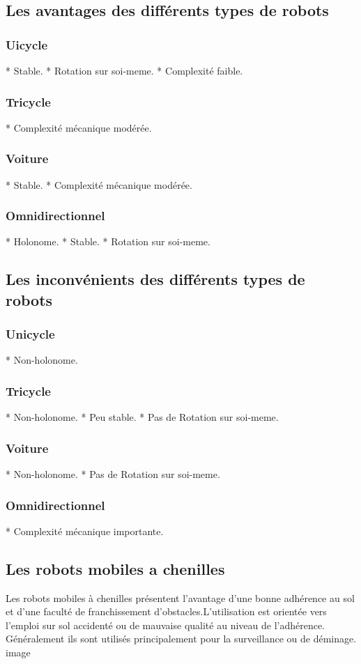 \subsection{Les avantages des différents types de robots }
\subsubsection{Uicycle}
* Stable.
* Rotation sur soi-meme.
* Complexité faible.
\subsubsection*{Tricycle}
* Complexité mécanique modérée.
\subsubsection{Voiture}
* Stable.
* Complexité mécanique modérée.
\subsubsection{Omnidirectionnel}
* Holonome.
* Stable.
* Rotation sur soi-meme.
\subsection{Les inconvénients des différents types de robots}
\subsubsection{Unicycle}
* Non-holonome.
\subsubsection{Tricycle}
* Non-holonome.
* Peu stable.
* Pas de Rotation sur soi-meme.
\subsubsection{Voiture}
* Non-holonome.
* Pas de Rotation sur soi-meme.
\subsubsection{Omnidirectionnel}
* Complexité mécanique importante.
\subsection{Les robots mobiles a chenilles}
Les robots mobiles à chenilles présentent l’avantage d’une bonne adhérence au sol et d’une faculté de franchissement d’obstacles.L’utilisation est orientée vers l’emploi sur sol accidenté ou de mauvaise qualité au niveau de l’adhérence. Généralement ils sont utilisés  principalement pour la surveillance ou de déminage.
image 
